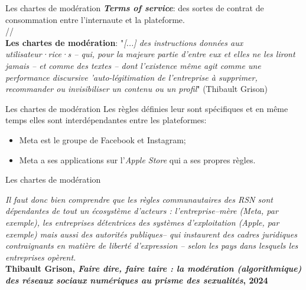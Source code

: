 \begin{frame}{Les chartes de modération}
    \textbf{\textit{Terms of service}}: des sortes de contrat de consommation entre l'internaute et la plateforme.\\
    \vspace{1em}
    // \\
    \vspace{1em}
    \textbf{Les chartes de modération}: "\textit{[...] des instructions données aux utilisateur·rice·s – qui, pour la majeure partie d’entre eux et elles ne les liront jamais – et comme des textes – dont l’existence même agit comme une performance discursive ’auto-légitimation
de l’entreprise à supprimer, recommander ou invisibiliser un contenu ou un profil}" (Thibault Grison)
\end{frame}

\begin{frame}{Les chartes de modération}
    Les règles définies leur sont spécifiques et en même temps elles sont interdépendantes entre les plateformes:
    \begin{itemize}
        \item Meta est le groupe de Facebook et Instagram;
        \item Meta a ses applications sur l'\textit{Apple Store} qui a ses propres règles.
    \end{itemize}
\end{frame}

\begin{frame}{Les chartes de modération}
    \begin{center}
        {\small \textit{Il faut donc bien comprendre que les règles communautaires des RSN sont dépendantes de tout un écosystème d’acteurs : l’entreprise–mère (Meta, par exemple), les entreprises détentrices des systèmes d’exploitation (Apple, par exemple) mais aussi des autorités publiques– qui instaurent des cadres juridiques contraignants en matière de liberté d’expression – selon les pays dans lesquels les entreprises opèrent.}}\\
        \textbf{Thibault Grison, \textit{Faire dire, faire taire : la modération (algorithmique) des réseaux sociaux numériques au prisme des sexualités}, 2024}
    \end{center}
\end{frame}

